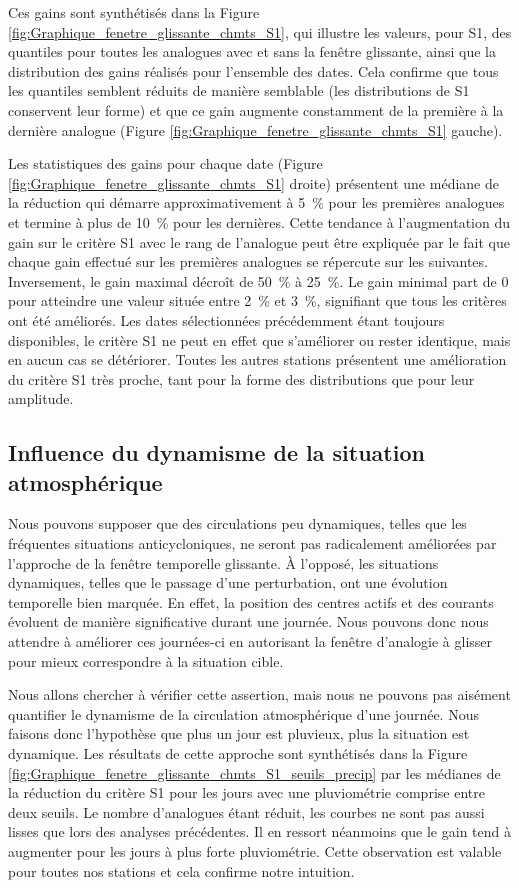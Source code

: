 \documentclass[hess]{copernicus}
\begin{document}
Ces gains sont synthétisés dans la Figure \ref{fig:Graphique_fenetre_glissante_chmts_S1}, qui illustre les valeurs, pour S1, des quantiles pour toutes les analogues avec et sans la fenêtre glissante, ainsi que la distribution des gains réalisés pour l'ensemble des dates. Cela confirme que tous les quantiles semblent réduits de manière semblable (les distributions de S1 conservent leur forme) et que ce gain augmente constamment de la première à la dernière analogue (Figure \ref{fig:Graphique_fenetre_glissante_chmts_S1} gauche). 

Les statistiques des gains pour chaque date (Figure \ref{fig:Graphique_fenetre_glissante_chmts_S1} droite) présentent une médiane de la réduction qui démarre approximativement à 5~\% pour les premières analogues et termine à plus de 10~\% pour les dernières. Cette tendance à l'augmentation du gain sur le critère S1 avec le rang de l'analogue peut être expliquée par le fait que chaque gain effectué sur les premières analogues se répercute sur les suivantes. Inversement, le gain maximal décroît de 50~\% à 25~\%. Le gain minimal part de 0 pour atteindre une valeur située entre 2~\% et 3~\%, signifiant que tous les critères ont été améliorés. Les dates sélectionnées précédemment étant toujours disponibles, le critère S1 ne peut en effet que s'améliorer ou rester identique, mais en aucun cas se détériorer. Toutes les autres stations présentent une amélioration du critère S1 très proche, tant pour la forme des distributions que pour leur amplitude.



\subsection{Influence du dynamisme de la situation atmosphérique}
\label{sec:ameliorations:fenetre:S1_pluie}

Nous pouvons supposer que des circulations peu dynamiques, telles que les fréquentes situations anticycloniques, ne seront pas radicalement améliorées par l'approche de la fenêtre temporelle glissante. À l'opposé, les situations dynamiques, telles que le passage d'une perturbation, ont une évolution temporelle bien marquée. En effet, la position des centres actifs et des courants évoluent de manière significative durant une journée. Nous pouvons donc nous attendre à améliorer ces journées-ci en autorisant la fenêtre d'analogie à glisser pour mieux correspondre à la situation cible.

Nous allons chercher à vérifier cette assertion, mais nous ne pouvons pas aisément quantifier le dynamisme de la circulation atmosphérique d'une journée. Nous faisons donc l'hypothèse que plus un jour est pluvieux, plus la situation est dynamique. Les résultats de cette approche sont synthétisés dans la Figure \ref{fig:Graphique_fenetre_glissante_chmts_S1_seuils_precip} par les médianes de la réduction du critère S1 pour les jours avec une pluviométrie comprise entre deux seuils. Le nombre d'analogues étant réduit, les courbes ne sont pas aussi lisses que lors des analyses précédentes. Il en ressort néanmoins que le gain tend à augmenter pour les jours à plus forte pluviométrie. Cette observation est valable pour toutes nos stations et cela confirme notre intuition.
\end{document}
